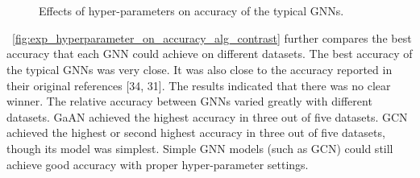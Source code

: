 \begin{figure}[H]
    \centering
    \\
    \\
    \caption{Effects of hyper-parameters on accuracy of the typical GNNs.}
    \label{fig:exp_hyperparameter_accuracy}
\end{figure}

\figurename~\ref{fig:exp_hyperparameter_on_accuracy_alg_contrast} further compares the best accuracy that each GNN could achieve on different datasets.
%
The best accuracy of the typical GNNs was very close.
%
%
It was also close to the accuracy reported in their original references [34, 31].
%
The results indicated that there was no clear winner.
%
The relative accuracy between GNNs varied greatly with different datasets.
%
GaAN achieved the highest accuracy in three out of five datasets.
%
GCN achieved the highest or second highest accuracy in three out of five datasets, though its model was simplest.
%
Simple GNN models (such as GCN) could still achieve good accuracy with proper hyper-parameter settings.

